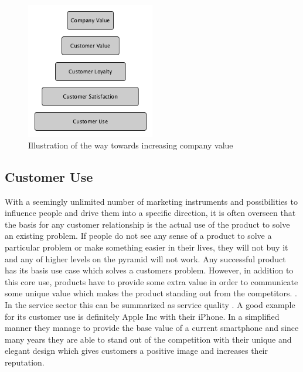 \begin{figure}
	\centering
	\includegraphics[width=0.5\textwidth]{img/introPyramid.png}
	\caption{Illustration of the way towards increasing company value \cite{neckel2015}}
	\label{fig:introPyramid}
\end{figure} 

\subsection{Customer Use}
With a seemingly unlimited number of marketing instruments and possibilities to influence people and drive them into a specific direction, it is often overseen that the basis for any customer relationship is the actual use of the product to solve an existing problem. If people do not see any sense of a product to solve a particular problem or make something easier in their lives, they will not buy it and any of higher levels on the pyramid will not work. Any successful product has its basis use case which solves a customers problem. However, in addition to this core use, products have to provide some extra value in order to communicate some unique value which makes the product standing out from the competitors. \cite{neckel2015}. In the service sector this can be summarized as service quality \cite{hussain2015service}. A good example for its customer use is definitely Apple Inc with their iPhone. In a simplified manner they manage to provide the base value of a current smartphone and since many years they are able to stand out of the competition with their unique and elegant design which gives customers a positive image and increases their reputation.

